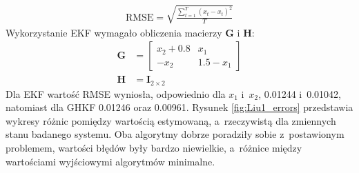 \begin{align}\label{eq:rmse}
\text{RMSE} = \sqrt{\frac{\sum_{t=1}^{T}(\hat{x}_t - x_t)^2}{T}}
\end{align}
Wykorzystanie EKF wymagało obliczenia macierzy $\boldsymbol{G}$ i $\boldsymbol{H}$:
\begin{align}\label{eq:LiuModel1GH}
\boldsymbol{G}&=
\begin{bmatrix}
x_2 + 0.8 & x_1 \\
-x_2 & 1.5 - x_1
\end{bmatrix} \nonumber \\
\boldsymbol{H}&=\boldsymbol{I}_{2 \times 2}
\end{align}
Dla EKF wartość RMSE wyniosła, odpowiednio dla $x_1$ i~$x_2$, 0.01244 i~0.01042, natomiast dla GHKF 0.01246 oraz 0.00961. Rysunek \ref{fig:Liu1_errors} przedstawia wykresy różnic pomiędzy wartością estymowaną, a~rzeczywistą dla zmiennych stanu badanego systemu. Oba algorytmy dobrze poradziły sobie z~postawionym problemem, wartości błędów były bardzo niewielkie, a~różnice między wartościami wyjściowymi algorytmów minimalne.   
